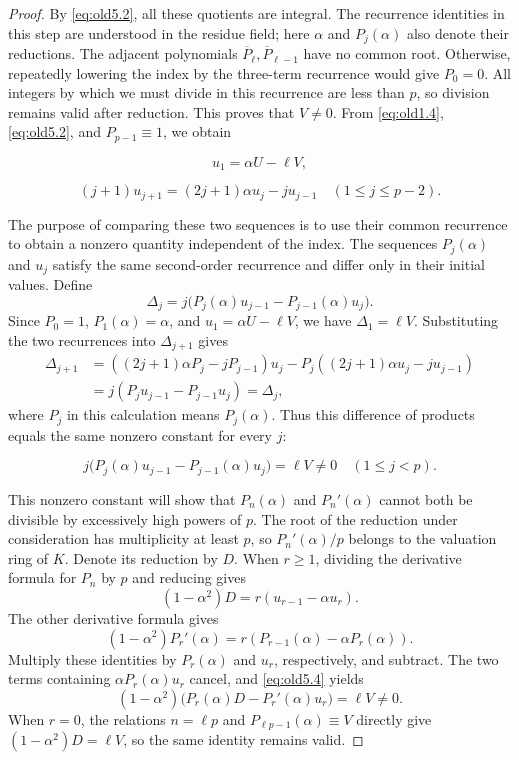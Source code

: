 \documentclass[11pt,a4paper]{article}
\numberwithin{equation}{section}
\theoremstyle{definition}
\begin{document}
\begin{proof}
By \eqref{eq:old5.2}, all these quotients are integral. The recurrence identities in this step are understood in the residue field; here \(\alpha\) and \(P_j(\alpha)\) also denote their reductions. The adjacent polynomials \(\overline P_{\ell},\overline P_{\ell-1}\) have no common root. Otherwise, repeatedly lowering the index by the three-term recurrence would give \(P_0=0\). All integers by which we must divide in this recurrence are less than \(p\), so division remains valid after reduction. This proves that \(V\ne0\). From \eqref{eq:old1.4}, \eqref{eq:old5.2}, and \(P_{p-1}\equiv1\), we obtain

\[
u_1=\alpha U-\ell V,
\]

\[
(j+1)u_{j+1}=(2j+1)\alpha u_j-ju_{j-1}
\quad(1\le j\le p-2).
\]

The purpose of comparing these two sequences is to use their common recurrence to obtain a nonzero quantity independent of the index. The sequences \(P_j(\alpha)\) and \(u_j\) satisfy the same second-order recurrence and differ only in their initial values. Define
\[
\Delta_j=j\bigl(P_j(\alpha)u_{j-1}-P_{j-1}(\alpha)u_j\bigr).
\]
Since \(P_0=1\), \(P_1(\alpha)=\alpha\), and \(u_1=\alpha U-\ell V\), we have \(\Delta_1=\ell V\). Substituting the two recurrences into \(\Delta_{j+1}\) gives
\begin{align*}
\Delta_{j+1}
&=((2j+1)\alpha P_j-jP_{j-1})u_j
 -P_j((2j+1)\alpha u_j-ju_{j-1})\\
&=j(P_ju_{j-1}-P_{j-1}u_j)=\Delta_j,
\end{align*}
where \(P_j\) in this calculation means \(P_j(\alpha)\). Thus this difference of products equals the same nonzero constant for every \(j\):

\begin{equation}
j\bigl(P_j(\alpha)u_{j-1}-P_{j-1}(\alpha)u_j\bigr)=\ell V\ne0
\quad(1\le j<p).
\label{eq:old5.4}
\end{equation}

This nonzero constant will show that \(P_n(\alpha)\) and \(P_n'(\alpha)\) cannot both be divisible by excessively high powers of \(p\). The root of the reduction under consideration has multiplicity at least \(p\), so \(P_n'(\alpha)/p\) belongs to the valuation ring of \(K\). Denote its reduction by \(D\). When \(r\ge1\), dividing the derivative formula for \(P_n\) by \(p\) and reducing gives
\[
(1-\alpha^2)D=r(u_{r-1}-\alpha u_r).
\]
The other derivative formula gives
\[
(1-\alpha^2)P_r'(\alpha)
=r(P_{r-1}(\alpha)-\alpha P_r(\alpha)).
\]
Multiply these identities by \(P_r(\alpha)\) and \(u_r\), respectively, and subtract. The two terms containing \(\alpha P_r(\alpha)u_r\) cancel, and \eqref{eq:old5.4} yields
\begin{equation}
(1-\alpha^2)\bigl(P_r(\alpha)D-P_r'(\alpha)u_r\bigr)=\ell V\ne0.
\label{eq:old5.5}
\end{equation}
When \(r=0\), the relations \(n=\ell p\) and \(P_{\ell p-1}(\alpha)\equiv V\) directly give \((1-\alpha^2)D=\ell V\), so the same identity remains valid.


\end{proof}
\end{document}
